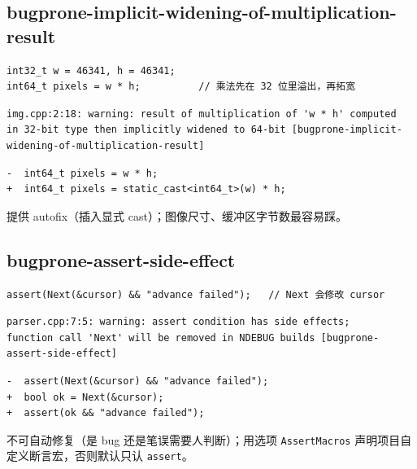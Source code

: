 \documentclass[12pt,a4paper,fontset=fandol]{ctexbook}
\begin{document}
\subsection{bugprone-implicit-widening-of-multiplication-result}\label{sec:ch13-s1d}
\begin{lstlisting}[style=cppstyle]
int32_t w = 46341, h = 46341;
int64_t pixels = w * h;          // 乘法先在 32 位里溢出，再拓宽
\end{lstlisting}
\begin{lstlisting}[style=shellstyle]
img.cpp:2:18: warning: result of multiplication of 'w * h' computed
in 32-bit type then implicitly widened to 64-bit [bugprone-implicit-widening-of-multiplication-result]
\end{lstlisting}
\begin{lstlisting}[style=diffstyle]
-  int64_t pixels = w * h;
+  int64_t pixels = static_cast<int64_t>(w) * h;
\end{lstlisting}
提供 autofix（插入显式 cast）；图像尺寸、缓冲区字节数最容易踩。
\subsection{bugprone-assert-side-effect}\label{sec:ch13-s1e}
\begin{lstlisting}[style=cppstyle]
assert(Next(&cursor) && "advance failed");   // Next 会修改 cursor
\end{lstlisting}
\begin{lstlisting}[style=shellstyle]
parser.cpp:7:5: warning: assert condition has side effects;
function call 'Next' will be removed in NDEBUG builds [bugprone-assert-side-effect]
\end{lstlisting}
\begin{lstlisting}[style=diffstyle]
-  assert(Next(&cursor) && "advance failed");
+  bool ok = Next(&cursor);
+  assert(ok && "advance failed");
\end{lstlisting}
不可自动修复（是 bug 还是笔误需要人判断）；用选项 \texttt{AssertMacros} 声明项目自定义断言宏，否则默认只认 \texttt{assert}。
\end{document}

